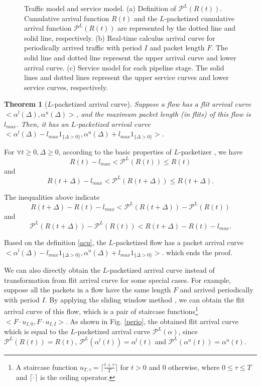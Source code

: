 \documentclass[preprint]{elsarticle}
\newtheorem{thm}{Theorem}
\begin{document}
\begin{figure}
  \caption{Traffic model and service model. (a) Definition of $\mathcal{P}^L(R(t))$. Cumulative arrival function $R(t)$ and the $L$-packetized cumulative arrival function $\mathcal{P}^L(R(t))$ are represented by the dotted line and solid line, respectively. (b) Real-time calculus arrival curve for periodically arrived traffic with period $I$ and packet length $F$. The solid line and dotted line represent the upper arrival curve and lower arrival curve. (c) Service model for each pipeline stage. The solid lines and dotted lines represent the upper service curves and lower service curves, respectively.}\label{ac}
\end{figure}
\begin{thm}[$L$-packetized arrival curve]\label{pktac}
Suppose a flow has a flit arrival curve $<\alpha^l(\Delta),\alpha^u(\Delta)>$, and the maximum packet length (in flits) of this flow is $l_{max}$. Then, it has an $L$-packetized arrival curve $<\alpha^l(\Delta)-l_{max}1_{\{\Delta>0\}},\alpha^u(\Delta)+l_{max}1_{\{\Delta>0\}}>$.
\end{thm}
\begin{pf}
For $\forall t\geq 0,\Delta\geq 0$, according to the basic properties of $L$-packetizer \cite{Boudec2001Network}, we have
$$R(t)-l_{max}< \mathcal{P}^L(R(t))\leq R(t)$$
and
$$R(t+\Delta)-l_{max}< \mathcal{P}^L(R(t+\Delta))\leq R(t+\Delta).$$

The inequalities above indicate
$$R(t+\Delta)-R(t)-l_{max}< \mathcal{P}^L(R(t+\Delta))-\mathcal{P}^L(R(t))$$
and
$$\mathcal{P}^L(R(t+\Delta))-\mathcal{P}^L(R(t))< R(t+\Delta)-R(t)-l_{max}.$$

Based on the definition \ref{acu}, the $L$-packetized flow has a packet arrival curve $<\alpha^l(\Delta)-l_{max}1_{\{\Delta>0\}},\alpha^u(\Delta)+l_{max}1_{\{\Delta>0\}}>$.
which ends the proof.
\end{pf}

We can also directly obtain the $L$-packetized arrival curve instead of transformation from flit arrival curve for some special cases. For example, suppose all the packets in a flow have the same length $F$ and arrived periodically with period $I$. By applying the sliding window method \cite{1253607}, we can obtain the flit arrival curve of this flow, which is a pair of staircase functions\footnote{A staircase function $u_{T,\tau}=\lceil\frac{t+\tau}{T}\rceil$ for $t>0$ and 0 otherwise, where $0\leq \tau\leq T$ and $\lceil\cdot\rceil$ is the ceiling operator.} $<F\cdot u_{I,0},F\cdot u_{I,I}>$. As shown in Fig. \ref{perio}, the obtained flit arrival curve which is equal to the $L$-packetized arrival curve $\mathcal{P}^L(\alpha)$, since $\mathcal{P}^L(R(t))=R(t)$, $\mathcal{P}^L(\alpha^l(t))=\alpha^l(t)$ and $\mathcal{P}^L(\alpha^u(t))=\alpha^u(t)$.
\end{document}
